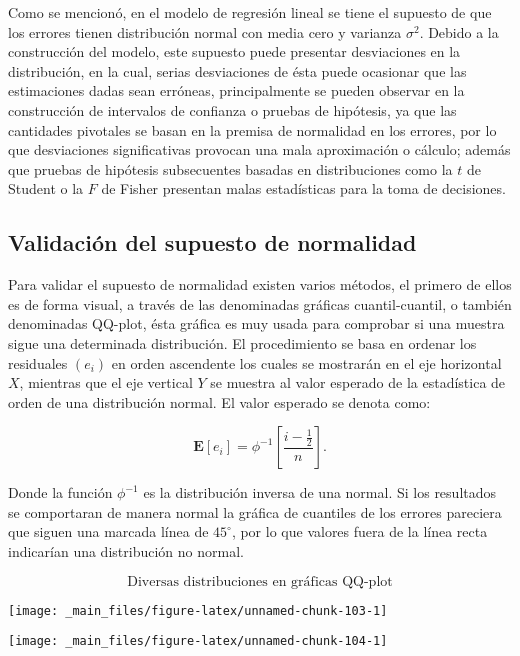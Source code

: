 \documentclass[
  a4paper,
  oneside,
  openany]{book}
\begin{document}
Como se mencionó, en el modelo de regresión lineal se tiene el supuesto de que los errores tienen distribución normal con media cero y varianza \(\sigma^2\). Debido a la construcción del modelo, este supuesto puede presentar desviaciones en la distribución, en la cual, serias desviaciones de ésta puede ocasionar que las estimaciones dadas sean erróneas, principalmente se pueden observar en la construcción de intervalos de confianza o pruebas de hipótesis, ya que las cantidades pivotales se basan en la premisa de normalidad en los errores, por lo que desviaciones significativas provocan una mala aproximación o cálculo; además que pruebas de hipótesis subsecuentes basadas en distribuciones como la \(t\) de Student o la \(F\) de Fisher presentan malas estadísticas para la toma de decisiones.

\hypertarget{validaciuxf3n-del-supuesto-de-normalidad}{%
\subsection{Validación del supuesto de normalidad}\label{validaciuxf3n-del-supuesto-de-normalidad}}

Para validar el supuesto de normalidad existen varios métodos, el primero de ellos es de forma visual, a través de las denominadas gráficas cuantil-cuantil, o también denominadas QQ-plot, ésta gráfica es muy usada para comprobar si una muestra sigue una determinada distribución. El procedimiento se basa en ordenar los residuales \((e_{i})\) en orden ascendente los cuales se mostrarán en el eje horizontal \(X\), mientras que el eje vertical \(Y\) se muestra al valor esperado de la estadística de orden de una distribución normal.
El valor esperado se denota como:

\[\mathbf{E}[e_{i}]=\phi^{-1}\left[\frac{i-\frac{1}{2}}{n}\right].\]

Donde la función \(\phi^{-1}\) es la distribución inversa de una normal. Si los resultados se comportaran de manera normal la gráfica de cuantiles de los errores pareciera que siguen una marcada línea de \(45^\circ\), por lo que valores fuera de la línea recta indicarían una distribución no normal.

\[\mbox{Diversas distribuciones en gráficas QQ-plot}\]

\begin{center}\texttt{[image: \_main\_files/figure-latex/unnamed-chunk-103-1]} \end{center}

\begin{center}\texttt{[image: \_main\_files/figure-latex/unnamed-chunk-104-1]} \end{center}
\end{document}
